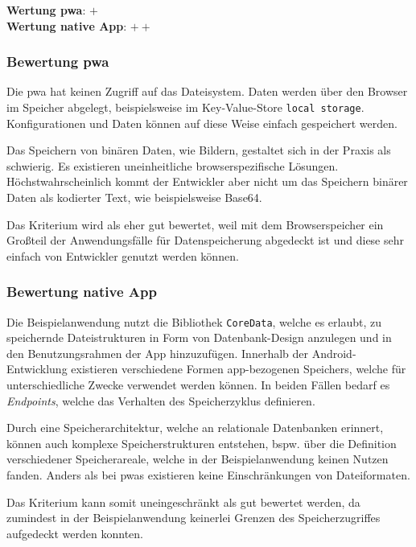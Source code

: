 \textbf{Wertung \ac{pwa}}: $+$\\
\textbf{Wertung native App}: $++$ \\

\subsubsection{Bewertung \ac{pwa}}
Die \ac{pwa} hat keinen Zugriff auf das Dateisystem. Daten werden über den Browser im Speicher abgelegt, beispielsweise im Key-Value-Store \texttt{local storage}. Konfigurationen und Daten können auf diese Weise einfach gespeichert werden.

Das Speichern von binären Daten, wie Bildern, gestaltet sich in der Praxis als schwierig. Es existieren uneinheitliche browserspezifische Lösungen. Höchstwahrscheinlich kommt der Entwickler aber nicht um das Speichern binärer Daten als kodierter Text, wie beispielsweise Base64.

Das Kriterium wird als eher gut bewertet, weil mit dem Browserspeicher ein Großteil der Anwendungsfälle für Datenspeicherung abgedeckt ist und diese sehr einfach von Entwickler genutzt werden können.

\subsubsection{Bewertung native App}
Die Beispielanwendung nutzt die Bibliothek \texttt{CoreData}, welche es erlaubt, zu speichernde Dateistrukturen in Form von Datenbank-Design anzulegen und in den Benutzungsrahmen der App hinzuzufügen. Innerhalb der Android-Entwicklung existieren verschiedene Formen app-bezogenen Speichers, welche für unterschiedliche Zwecke verwendet werden können. In beiden Fällen bedarf es \textit{Endpoints}, welche das Verhalten des Speicherzyklus definieren.

Durch eine Speicherarchitektur, welche an relationale Datenbanken erinnert, können auch komplexe Speicherstrukturen entstehen, bspw. über die Definition verschiedener Speicherareale, welche in der Beispielanwendung keinen Nutzen fanden. Anders als bei \acp{pwa} existieren keine Einschränkungen von Dateiformaten.

Das Kriterium kann somit uneingeschränkt als gut bewertet werden, da zumindest in der Beispielanwendung keinerlei Grenzen des Speicherzugriffes aufgedeckt werden konnten.